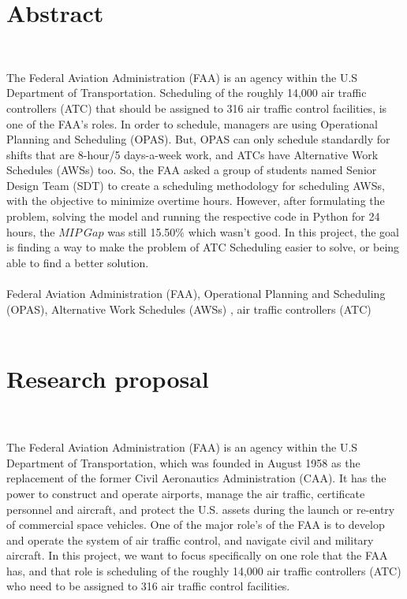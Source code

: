\documentclass[11pt]{article}
\begin{document}
		
\section{Abstract}\\
\par The Federal Aviation Administration (FAA) is an agency within the U.S Department of Transportation. Scheduling of the roughly 14,000 air traffic controllers (ATC) that should be assigned to 316 air traffic control facilities, is one of the FAA's roles. In order to schedule, managers are using Operational Planning and Scheduling (OPAS). But, OPAS can only schedule standardly for shifts that are 8-hour/5 days-a-week work, and ATCs have Alternative Work Schedules (AWSs) too. So, the FAA asked a group of students named Senior Design Team (SDT) to create a scheduling methodology for scheduling AWSs, with the objective to minimize overtime hours. However, after formulating the problem, solving the model and running the respective code in Python for 24 hours, the $MIP \  Gap$ was still  15.50\% which wasn't good. In this project, the goal is finding a way to make the problem of ATC Scheduling easier to solve, or being able to find a better solution.
\\
\\
Federal Aviation Administration (FAA), Operational Planning and Scheduling (OPAS), Alternative Work Schedules (AWSs) , air traffic controllers (ATC)
\\
\\

\section{Research proposal}
\\

\\

The Federal Aviation Administration (FAA) is an agency within the U.S Department of Transportation, which was founded in August 1958 as the replacement of the former Civil Aeronautics Administration (CAA). It has the power to construct and operate  airports, manage the air traffic, certificate personnel and aircraft, and  protect the U.S. assets during the launch or re-entry of commercial space vehicles. One of the major role's of the FAA is to develop and operate the system of air traffic control, and navigate civil and military aircraft. In this project, we want to focus specifically on one role that the FAA has, and that role is scheduling of the roughly 14,000 air traffic controllers (ATC) who need to be assigned to 316 air traffic control facilities. \\
\\
\end{document}

